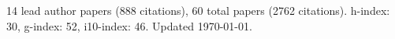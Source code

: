 14 lead author papers (888 citations),
60 total papers (2762 citations).\newline
h-index: 30, g-index: 52, i10-index: 46. Updated \today.